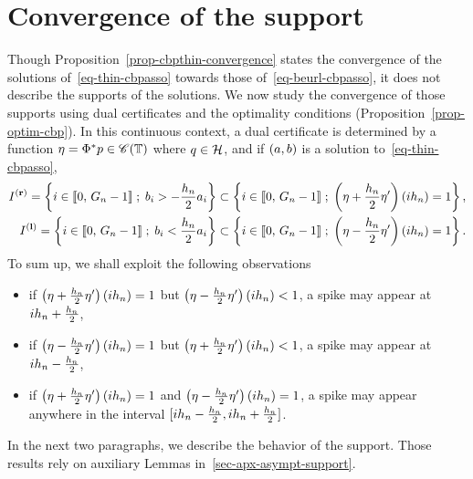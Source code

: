 \section{Convergence of the support}
\label{sec-asympt-support}
Though Proposition~\ref{prop-cbpthin-convergence} states the convergence of the solutions of~\eqref{eq-thin-cbpasso} towards those of~\eqref{eq-beurl-cbpasso}, it does not describe the supports of the solutions. We now study the convergence of those supports using dual certificates and the optimality conditions (Proposition~\ref{prop-optim-cbp}). 
In this continuous context, a dual certificate is determined by a function $\eta=\Phi^*p\in\mathscr{C}(\mathbb{T})$ where $q\in \mathcal{H}$, and if $(a,b)$ is a solution to~\eqref{eq-thin-cbpasso},
\begin{align*}
  {I^{\mathbf{(r)}}}=\left\{ i\in\llbracket 0,\,{G_n}-1 \rrbracket \;;\; b_i>-\frac{{h_n}}{2}a_i \right\} \subset \left\{ i\in\llbracket 0,\,{G_n}-1 \rrbracket \;;\; \left(\eta+\frac{{h_n}}{2}\eta'\right)(i{h_n})=1 \right\},\\
  {I^{\mathbf{(l)}}}=\left\{ i\in\llbracket 0,\,{G_n}-1 \rrbracket \;;\; b_i<\frac{{h_n}}{2}a_i \right\} \subset \left\{ i\in\llbracket 0,\,{G_n}-1 \rrbracket \;;\; \left(\eta-\frac{{h_n}}{2}\eta'\right)(i{h_n})=1 \right\}.
\end{align*}
To sum up, we shall exploit the following observations
\begin{itemize}
  \item if $\left(\eta+\frac{{h_n}}{2}\eta'\right)(i{h_n})=1$ but $\left(\eta-\frac{{h_n}}{2}\eta'\right)(i{h_n})<1$, a spike may appear at $i{h_n}+\frac{{h_n}}{2}$,
  \item if $\left(\eta-\frac{{h_n}}{2}\eta'\right)(i{h_n})=1$ but $\left(\eta+\frac{{h_n}}{2}\eta'\right)(i{h_n})<1$, a spike may appear at $i{h_n}-\frac{{h_n}}{2}$,
  \item if $\left(\eta+\frac{{h_n}}{2}\eta'\right)(i{h_n})=1$ and $\left(\eta-\frac{{h_n}}{2}\eta'\right)(i{h_n})=1$, a spike may appear anywhere in the interval $[i{h_n}-\frac{{h_n}}{2},i{h_n}+\frac{{h_n}}{2}]$.
\end{itemize}

In the next two paragraphs, we describe the behavior of the support. Those results rely on auxiliary Lemmas in~\ref{sec-apx-asympt-support}.
